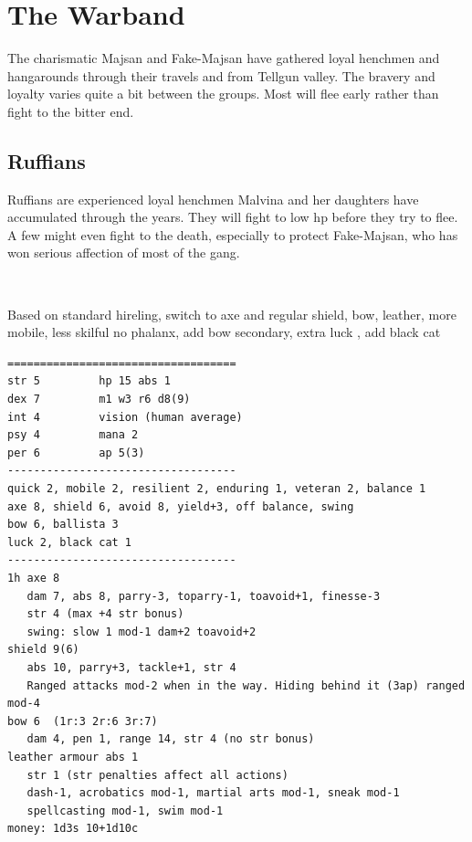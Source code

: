 \section*{The Warband}

The charismatic Majsan and Fake-Majsan have gathered loyal henchmen and hangarounds through their travels and from Tellgun valley. The bravery and loyalty varies quite a bit between the groups. Most will flee early rather than fight to the bitter end.



\begin{samepage}
\subsection*{Ruffians}
Ruffians are experienced loyal henchmen Malvina and her daughters have accumulated through the years. They will fight to low hp before they try to flee. A few might even fight to the death, especially to protect Fake-Majsan, who has won serious affection of most of the gang.

\

Based on standard hireling, switch to axe and regular shield, bow, leather,
more mobile, less skilful no phalanx,
add bow secondary, extra luck , add black cat
\small \begin{verbatim}
===================================
str 5         hp 15 abs 1
dex 7         m1 w3 r6 d8(9)
int 4         vision (human average)
psy 4         mana 2
per 6         ap 5(3)
-----------------------------------
quick 2, mobile 2, resilient 2, enduring 1, veteran 2, balance 1
axe 8, shield 6, avoid 8, yield+3, off balance, swing
bow 6, ballista 3
luck 2, black cat 1
-----------------------------------
1h axe 8
   dam 7, abs 8, parry-3, toparry-1, toavoid+1, finesse-3
   str 4 (max +4 str bonus)
   swing: slow 1 mod-1 dam+2 toavoid+2
shield 9(6)
   abs 10, parry+3, tackle+1, str 4
   Ranged attacks mod-2 when in the way. Hiding behind it (3ap) ranged mod-4
bow 6  (1r:3 2r:6 3r:7)
   dam 4, pen 1, range 14, str 4 (no str bonus)
leather armour abs 1
   str 1 (str penalties affect all actions)
   dash-1, acrobatics mod-1, martial arts mod-1, sneak mod-1
   spellcasting mod-1, swim mod-1
money: 1d3s 10+1d10c
\end{verbatim} \normalsize
\end{samepage}

